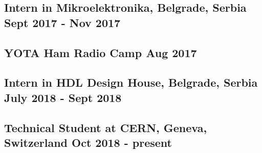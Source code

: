 \documentclass{article}
\begin{document}
\subsection{Intern in Mikroelektronika, Belgrade, Serbia \hfill 
Sept 2017 - Nov 2017}

\subsection{YOTA Ham Radio Camp \hfill
Aug 2017}

\subsection{Intern in HDL Design House, Belgrade, Serbia \hfill 
July 2018 - Sept 2018}

\subsection{Technical Student at CERN, Geneva, Switzerland \hfill 
Oct 2018 - present}
\end{document}
